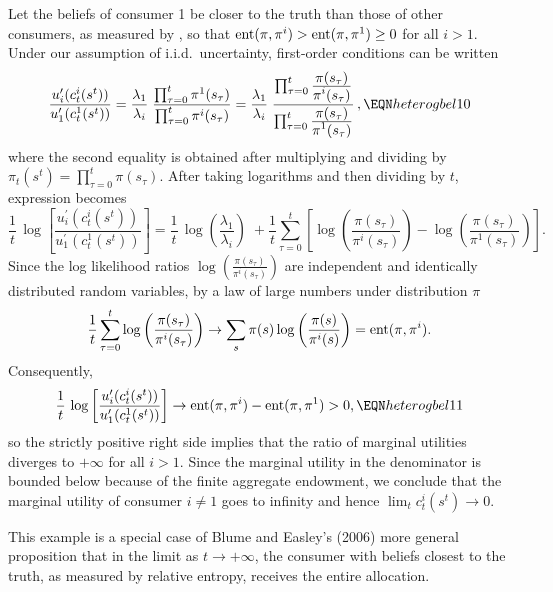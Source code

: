 Let the beliefs
of consumer 1 be closer to the truth than those of
other consumers, as measured by  , so that
${\rm ent}(\pi, \pi^i) > {\rm ent}(\pi, \pi^1) \geq 0$ for all
$i>1$.
Under our assumption of i.i.d.\ uncertainty, first-order
conditions  can be written
$$ {\frac{u_i^\prime(c^i_t(s^t))}{u_1^\prime(c^1_t(s^t))}}
 = {\frac{\lambda_1}{\lambda_i}} \;
   {\frac{\prod_{\tau=0}^t \pi^1(s_{\tau})}
        {\prod_{\tau=0}^t \pi^i(s_{\tau})}}
 = {\frac{\lambda_1}{\lambda_i}} \;
{\frac{\prod_{\tau=0}^t {\frac{\displaystyle \pi(s_{\tau})}
                            {\displaystyle \pi^i(s_{\tau})}}}
     {\prod_{\tau=0}^t {\frac{\displaystyle \pi(s_{\tau})}
                            {\displaystyle \pi^1(s_{\tau})}}}}\,,
                                                    \EQN heterogbel10
$$
where the second equality is obtained after multiplying and dividing
by $\pi_t(s^t)=\prod_{\tau=0}^t \pi(s_{\tau})$. After taking
logarithms and then dividing by $t$, expression 
becomes
$$ {\frac{1}{t}}\,
\log\left[{\frac{u_i^\prime(c^i_t(s^t))}{u_1^\prime(c^1_t(s^t))}}\right]
 = {\frac{1}{t}}\, \log\left({\frac{\lambda_1}{\lambda_i}}\right) \; +
{\frac{1}{t}}\sum_{\tau=0}^t
\left[\log\left({\frac{\pi(s_{\tau})}{\pi^i(s_{\tau})}}\right)
- \log\left({\frac{\pi(s_{\tau})}{\pi^1(s_{\tau})}}\right)\right].
$$
Since the log likelihood ratios
$\log\left({\frac{\pi(s_{\tau})}{\pi^i(s_{\tau})}}\right)$ are
independent and identically distributed random variables, by
a law of large numbers under distribution $\pi$
$$ {\frac{1}{t}}\sum_{\tau=0}^t
\log\left({\frac{\pi(s_{\tau})}{\pi^i(s_{\tau})}}\right)
\rightarrow
\sum_s \pi(s) \log \left({\frac{\pi(s)}{\pi^i(s)}}\right)
= {\rm ent}(\pi, \pi^i).
$$
Consequently,
$$ {\frac{1}{t}}\,
\log\left[{\frac{u_i^\prime(c^i_t(s^t))}{u_1^\prime(c^1_t(s^t))}}\right]
\rightarrow
{\rm ent}(\pi, \pi^i) - {\rm ent}(\pi, \pi^1) >0,
                                                    \EQN heterogbel11
$$
so the strictly positive right side implies that the ratio of marginal
utilities diverges to $+\infty$ for all $i > 1$. Since the marginal utility in the
denominator is bounded below because of the finite aggregate endowment,
we conclude that the marginal utility of consumer $i \neq 1$ goes to
infinity and hence $\lim_t c^i_t(s^t)\rightarrow 0$.

This example is a special case of
Blume and Easley's (2006) more general proposition that in the limit as $t \rightarrow +\infty$, the  consumer with beliefs closest to the truth, as measured by relative entropy, receives the entire allocation.
%
%
%



